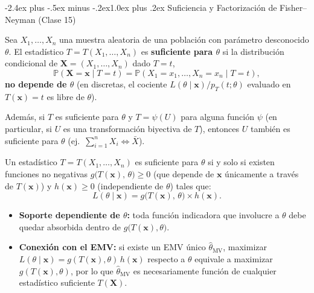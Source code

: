 \documentclass[10pt,a4paper]{article}
\makeatletter
\newcommand{\Prob}{\mathbb{P}}
\renewcommand\section{\@startsection{section}{1}{0pt}%
  {-2.4ex plus -.5ex minus -.2ex}{1.0ex plus .2ex}%
  {\normalfont\large\bfseries\color{seccolor}}}
\makeatother
\begin{document}
\section{Suficiencia y Factorización de Fisher--Neyman \textmd{(Clase 15)}}

\begin{defbox}[frametitle={Definición · Estadístico suficiente}]
Sea $X_1, \dots, X_n$ una muestra aleatoria de una población con parámetro desconocido $\theta$. El estadístico $T = T(X_1, \dots, X_n)$ es \textbf{suficiente para $\theta$} si la distribución condicional de $\mathbf{X} = (X_1, \dots, X_n)$ dado $T = t$,
\[
\Prob(\mathbf{X} = \mathbf{x} \mid T = t) = \Prob(X_1 = x_1, \dots, X_n = x_n \mid T = t),
\]
\textbf{no depende de $\theta$} (en discretas, el cociente $L(\theta \mid \mathbf{x}) / p_T(t;\theta)$ evaluado en $T(\mathbf{x}) = t$ es libre de $\theta$).

Además, si $T$ es suficiente para $\theta$ y $T = \psi(U)$ para alguna función $\psi$ (en particular, si $U$ es una transformación biyectiva de $T$), entonces $U$ también es suficiente para $\theta$ (ej.\ $\sum_{i=1}^n X_i \iff \bar X$).
\end{defbox}

\begin{thmbox}[frametitle={Teorema de Factorización de Fisher--Neyman}]
Un estadístico $T = T(X_1, \dots, X_n)$ es suficiente para $\theta$ si y solo si existen funciones no negativas $g\big(T(\mathbf{x}),\,\theta\big) \ge 0$ (que depende de $\mathbf{x}$ únicamente a través de $T(\mathbf{x})$) y $h(\mathbf{x}) \ge 0$ (independiente de $\theta$) tales que:
\[
L(\theta \mid \mathbf{x}) = g\big(T(\mathbf{x}),\,\theta\big) \times h(\mathbf{x}).
\]
\begin{itemize}
  \item \textbf{Soporte dependiente de $\theta$:} toda función indicadora que involucre a $\theta$ debe quedar absorbida dentro de $g\big(T(\mathbf{x}),\theta\big)$.
  \item \textbf{Conexión con el EMV:} si existe un EMV único $\hat\theta_{\text{MV}}$, maximizar $L(\theta \mid \mathbf{x}) = g(T(\mathbf{x}),\theta)\,h(\mathbf{x})$ respecto a $\theta$ equivale a maximizar $g(T(\mathbf{x}),\theta)$, por lo que $\hat\theta_{\text{MV}}$ es necesariamente función de cualquier estadístico suficiente $T(\mathbf{X})$.
\end{itemize}
\end{thmbox}
\end{document}
